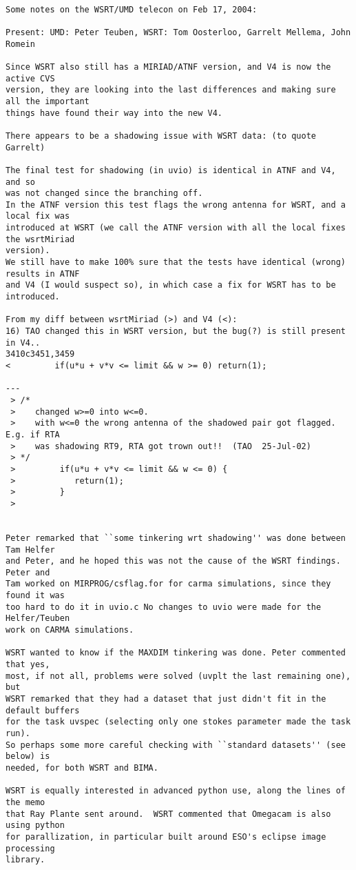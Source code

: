\begin{verbatim}

Some notes on the WSRT/UMD telecon on Feb 17, 2004:

Present: UMD: Peter Teuben, WSRT: Tom Oosterloo, Garrelt Mellema, John Romein

Since WSRT also still has a MIRIAD/ATNF version, and V4 is now the active CVS
version, they are looking into the last differences and making sure all the important
things have found their way into the new V4.

There appears to be a shadowing issue with WSRT data: (to quote Garrelt)

The final test for shadowing (in uvio) is identical in ATNF and V4, and so
was not changed since the branching off.
In the ATNF version this test flags the wrong antenna for WSRT, and a local fix was
introduced at WSRT (we call the ATNF version with all the local fixes the wsrtMiriad
version).
We still have to make 100% sure that the tests have identical (wrong) results in ATNF
and V4 (I would suspect so), in which case a fix for WSRT has to be introduced.

From my diff between wsrtMiriad (>) and V4 (<):
16) TAO changed this in WSRT version, but the bug(?) is still present in V4..
3410c3451,3459
<         if(u*u + v*v <= limit && w >= 0) return(1);

---
 > /*
 >    changed w>=0 into w<=0.
 >    with w<=0 the wrong antenna of the shadowed pair got flagged. E.g. if RTA
 >    was shadowing RT9, RTA got trown out!!  (TAO  25-Jul-02)
 > */
 >         if(u*u + v*v <= limit && w <= 0) {
 >            return(1);
 >         }
 >


Peter remarked that ``some tinkering wrt shadowing'' was done between Tam Helfer
and Peter, and he hoped this was not the cause of the WSRT findings. Peter and
Tam worked on MIRPROG/csflag.for for carma simulations, since they found it was
too hard to do it in uvio.c No changes to uvio were made for the Helfer/Teuben 
work on CARMA simulations.

WSRT wanted to know if the MAXDIM tinkering was done. Peter commented that yes,
most, if not all, problems were solved (uvplt the last remaining one), but
WSRT remarked that they had a dataset that just didn't fit in the default buffers
for the task uvspec (selecting only one stokes parameter made the task run).
So perhaps some more careful checking with ``standard datasets'' (see below) is 
needed, for both WSRT and BIMA.

WSRT is equally interested in advanced python use, along the lines of the memo
that Ray Plante sent around.  WSRT commented that Omegacam is also using python
for parallization, in particular built around ESO's eclipse image processing
library.


\end{verbatim}
